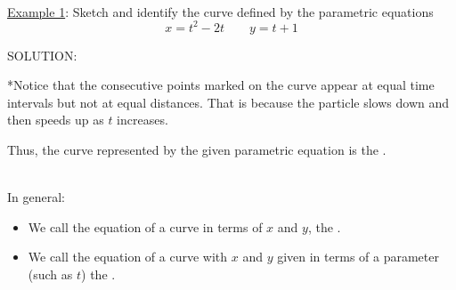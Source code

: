 \documentclass[paper=a4, fontsize=11pt]{scrartcl} %
\numberwithin{equation}{section} %
\numberwithin{figure}{section} %
\numberwithin{table}{section} %
\begin{document}
  \indent\\
  \indent
  

  
  \underline{Example 1}: Sketch and identify the curve defined by the parametric equations
  \[x=t^2 - 2t \quad \quad y=t+1\]
 
 SOLUTION:\\
 
 
 \vspace{3in}
 
 *Notice that the consecutive points marked on the curve appear at equal time intervals but not at equal distances. That is because the particle slows down and then speeds up as $t$ increases. \\
 
 
 \vspace{2in}
 
 Thus, the curve represented by the given parametric equation is the \underline{\hspace{1in}} \underline{\hspace{1.9in}}.\\
 \indent\\
 \indent
 \vspace{0.5in}
 
 In general:\\

\begin{itemize}
 \item We call the equation of a curve in terms of $x$ and $y$, the \underline{\hspace{1.25in}} \underline{\hspace{1in}}.\\
 \item We call the equation of a curve with $x$ and $y$ given in terms of a parameter (such as $t$) the \underline{\hspace{1.25in}} \underline{\hspace{1in}}.
 \end{itemize}
 
\end{document}
